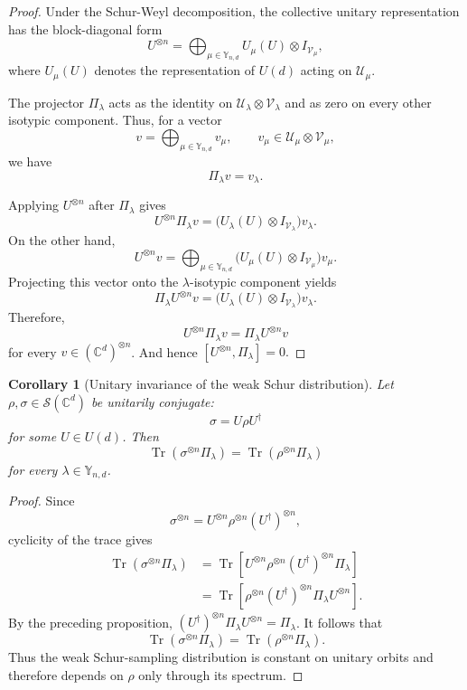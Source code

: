 \documentclass{article}
\newtheorem{corollary}[theorem]{Corollary}
\theoremstyle{named}
\theoremstyle{named1}
\theoremstyle{plain}
\theoremstyle{remark}
\begin{document}
\begin{proof}
Under the Schur-Weyl decomposition, the collective unitary
representation has the block-diagonal form
\[
U^{\otimes n}
=
\bigoplus_{\mu\in\mathbb Y_{n,d}}
U_\mu(U)\otimes I_{\mathcal V_\mu},
\]
where \(U_\mu(U)\) denotes the representation of \(U(d)\) acting on
\(\mathcal U_\mu\).

The projector \(\Pi_\lambda\) acts as the identity on
\(\mathcal U_\lambda\otimes\mathcal V_\lambda\) and as zero on every
other isotypic component. Thus, for a vector
\[
v=\bigoplus_{\mu\in\mathbb Y_{n,d}}v_\mu,
\qquad
v_\mu\in\mathcal U_\mu\otimes\mathcal V_\mu,
\]
we have
\[
\Pi_\lambda v=v_\lambda.
\]

Applying \(U^{\otimes n}\) after \(\Pi_\lambda\) gives
\[
U^{\otimes n}\Pi_\lambda v
=
\bigl(U_\lambda(U)\otimes I_{\mathcal V_\lambda}\bigr)v_\lambda.
\]
On the other hand,
\[
U^{\otimes n}v
=
\bigoplus_{\mu\in\mathbb Y_{n,d}}
\bigl(U_\mu(U)\otimes I_{\mathcal V_\mu}\bigr)v_\mu.
\]
Projecting this vector onto the \(\lambda\)-isotypic component yields
\[
\Pi_\lambda U^{\otimes n}v
=
\bigl(U_\lambda(U)\otimes I_{\mathcal V_\lambda}\bigr)v_\lambda.
\]
Therefore,
\[
U^{\otimes n}\Pi_\lambda v
=
\Pi_\lambda U^{\otimes n}v
\]
for every \(v\in(\mathbb C^d)^{\otimes n}\). And hence
$
[U^{\otimes n},\Pi_\lambda]=0.
$
\end{proof}

\begin{corollary}[Unitary invariance of the weak Schur distribution]
Let \(\rho,\sigma\in\mathcal S(\mathbb C^d)\) be unitarily
conjugate:
\[
\sigma=U\rho U^\dagger
\]
for some \(U\in U(d)\). Then
\[
\operatorname{Tr}
\left(
\sigma^{\otimes n}\Pi_\lambda
\right)
=
\operatorname{Tr}
\left(
\rho^{\otimes n}\Pi_\lambda
\right)
\]
for every \(\lambda\in\mathbb Y_{n,d}\).
\end{corollary}

\begin{proof}
Since
\[
\sigma^{\otimes n}
=
U^{\otimes n}\rho^{\otimes n}(U^\dagger)^{\otimes n},
\]
cyclicity of the trace gives
\begin{align*}
\operatorname{Tr}
\left(
\sigma^{\otimes n}\Pi_\lambda
\right)
&=
\operatorname{Tr}
\left[
U^{\otimes n}\rho^{\otimes n}
(U^\dagger)^{\otimes n}\Pi_\lambda
\right]\\
&=
\operatorname{Tr}
\left[
\rho^{\otimes n}
(U^\dagger)^{\otimes n}
\Pi_\lambda U^{\otimes n}
\right].
\end{align*}
By the preceding proposition,
$(U^\dagger)^{\otimes n}\Pi_\lambda U^{\otimes n}
=\Pi_\lambda$.
It follows that
\[
\operatorname{Tr}
\left(
\sigma^{\otimes n}\Pi_\lambda
\right)
=
\operatorname{Tr}
\left(
\rho^{\otimes n}\Pi_\lambda
\right).
\]
Thus the weak Schur-sampling distribution is constant on unitary
orbits and therefore depends on \(\rho\) only through its spectrum.
\end{proof}
\end{document}
